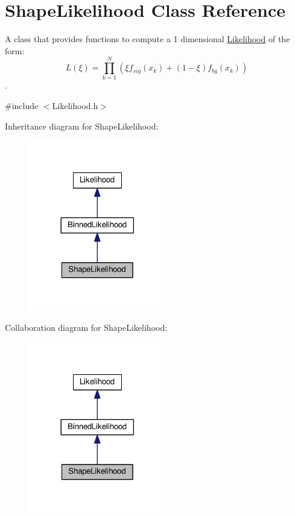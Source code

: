 \hypertarget{classShapeLikelihood}{\section{Shape\-Likelihood Class Reference}
\label{classShapeLikelihood}
}


A class that provides functions to compute a 1 dimensional \hyperlink{classLikelihood}{Likelihood} of the form\-: \[ L(\xi) = \prod^N_{k=1} (\xi f_{sig}(x_k) + (1-\xi) f_{bg}(x_k)) \].  




{\ttfamily \#include $<$Likelihood.\-h$>$}



Inheritance diagram for Shape\-Likelihood\-:
\nopagebreak
\begin{figure}[H]
\begin{center}
\leavevmode
\includegraphics[width=170pt]{classShapeLikelihood__inherit__graph}
\end{center}
\end{figure}


Collaboration diagram for Shape\-Likelihood\-:
\nopagebreak
\begin{figure}[H]
\begin{center}
\leavevmode
\includegraphics[width=170pt]{classShapeLikelihood__coll__graph}
\end{center}
\end{figure}
